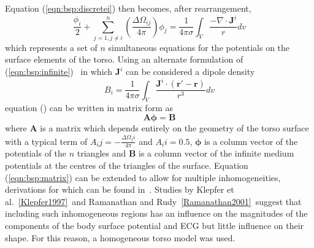 Equation (\ref{eqn:bsp:discretei}) then becomes, after rearrangement,
\begin{equation}
\label{eqn:bsp:discretefinal}
\frac{\phi_{i}}{2} + \sum_{j=1,j \neq i}^n \left(\frac{\Delta\Omega_{ij}}{4\pi} \right)\phi_{j} =
\frac{1}{4 \pi \sigma}\int_{V} \frac{-\nabla \cdot \mathbf{J}^{i}}{r}dv
\end{equation}
which represents a set of $n$ simultaneous equations for the potentials on the
surface elements of the torso.
Using an alternate formulation of (\ref{eqn:bsp:infinite})~\cite{Plonsey1989} in
which $\mathbf{J}^i$ can be considered a dipole density
\begin{equation}
\label{eqn:bsp:b}
B_i = \frac{1}{4 \pi \sigma}\int_{V} \frac{\mathbf{J}^{i}\cdot
\left(\mathbf{r'}-\mathbf{r}\right)}{r^3}dv
\end{equation}
equation (\label{eqn:bsp:discretefinal}) can be written in matrix form as
\begin{equation}
\label{eqn:bsp:matrix}
\mathbf{A}\mathbf{\phi} = \mathbf{B}
\end{equation}
where $\mathbf{A}$ is a matrix which depends entirely on the geometry of the
torso surface with a typical term of $\displaystyle A_ij =
-\frac{\Delta\Omega_ji}{4\pi}$ and $A_ii = 0.5$, $\mathbf{\phi}$ is a column
vector of the potentials of the $n$ triangles and $\mathbf{B}$ is a column
vector of the infinite medium potentials at the centres of the triangles of the
surface.
Equation (\ref{eqn:bsp:matrix}) can be extended to allow for multiple
inhomogeneities, derivations for which can be found
in~\cite{Barr1966,Geselowitz1968,Geselowitz1970}.
Studies by Klepfer et al.~\ref{Klepfer1997}\ and Ramanathan and
Rudy~\ref{Ramanathan2001}\ suggest that including such inhomogeneous regions has
an influence on the magnitudes of the components of the body surface potential
and ECG but little influence on their shape.
For this reason, a homogeneous torso model was used.

